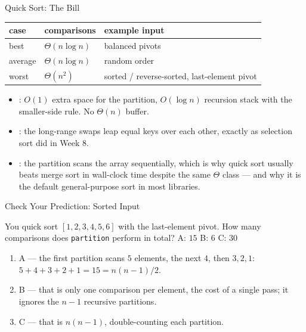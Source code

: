 \documentclass[aspectratio=169]{beamer}
\begin{document}
\begin{frame}{Quick Sort: The Bill}
  \begin{center}
  {\footnotesize
  \begin{tabular}{lll}
    \toprule
    \textbf{case} & \textbf{comparisons} & \textbf{example input} \\
    \midrule
    best & $\Theta(n\log n)$ & balanced pivots \\
    average & $\Theta(n\log n)$ & random order \\
    worst & $\Theta(n^2)$ & sorted / reverse-sorted, last-element pivot \\
    \bottomrule
  \end{tabular}}
  \end{center}
  \begin{itemize}
    \item {}: $O(1)$ extra space for the partition, $O(\log n)$
      recursion stack with the smaller-side rule. No $\Theta(n)$ buffer.
    \item {}: the long-range swaps leap equal keys over each
      other, exactly as selection sort did in Week 8.
    \item {}: the partition scans the array sequentially,
      which is why quick sort usually beats merge sort in wall-clock time
      despite the same $\Theta$ class --- and why it is the default
      general-purpose sort in most libraries.
  \end{itemize}
\end{frame}

\begin{frame}{Check Your Prediction: Sorted Input}
  \begin{block}{You quick sort $[1,2,3,4,5,6]$ with the last-element pivot.
    How many comparisons does \texttt{partition} perform in total?}
    A: $15$ \quad B: $6$ \quad C: $30$
  \end{block}
  \begin{enumerate}
    \item A --- the first partition scans $5$ elements, the next $4$, then
      $3, 2, 1$: $5+4+3+2+1 = 15 = n(n-1)/2$.
    \item B --- that is only one comparison per element, the cost of a single
      pass; it ignores the $n-1$ recursive partitions.
    \item C --- that is $n(n-1)$, double-counting each partition.
  \end{enumerate}
\end{frame}
\end{document}

